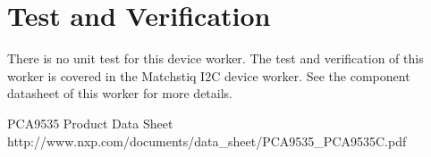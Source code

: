 \documentclass{article}
\def\Comp{PCA9535}
\begin{document}
\section*{Test and Verification}
There is no unit test for this device worker. The test and verification of this worker is covered in the Matchstiq I2C device worker. See the component datasheet of this worker for more details.
  \begin{thebibliography}{1}

   \Comp{} Product Data Sheet\\
	http://www.nxp.com/documents/data\_sheet/PCA9535\_PCA9535C.pdf
  \end{thebibliography}
\end{document}

